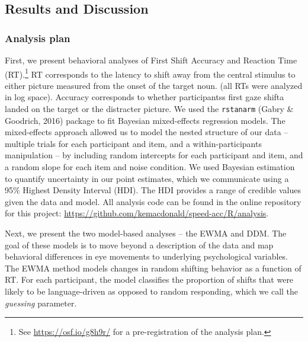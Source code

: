 \documentclass[10pt, letterpaper]{article}
\begin{document}
\subsection{Results and Discussion}\label{results-and-discussion}

\subsubsection{Analysis plan}\label{analysis-plan}

First, we present behavioral analyses of First Shift Accuracy and
Reaction Time (RT).\footnote{See \url{https://osf.io/g8h9r/} for a
  pre-registration of the analysis plan.} RT corresponds to the latency
to shift away from the central stimulus to either picture measured from
the onset of the target noun. (all RTs were analyzed in log space).
Accuracy corresponds to whether participantss first gaze shifta landed
on the target or the distracter picture. We used the \texttt{rstanarm}
(Gabry \& Goodrich, 2016) package to fit Bayesian mixed-effects
regression models. The mixed-effects approach allowed us to model the
nested structure of our data -- multiple trials for each participant and
item, and a within-participants manipulation -- by including random
intercepts for each participant and item, and a random slope for each
item and noise condition. We used Bayesian estimation to quantify
uncertainty in our point estimates, which we communicate using a 95\%
Highest Density Interval (HDI). The HDI provides a range of credible
values given the data and model. All analysis code can be found in the
online repository for this project:
\url{https://github.com/kemacdonald/speed-acc/R/analysis}.

Next, we present the two model-based analyses -- the EWMA and DDM. The
goal of these models is to move beyond a description of the data and map
behavioral differences in eye movements to underlying psychological
variables. The EWMA method models changes in random shifting behavior as
a function of RT. For each participant, the model classifies the
proportion of shifts that were likely to be language-driven as opposed
to random responding, which we call the \emph{guessing} parameter.
\end{document}
